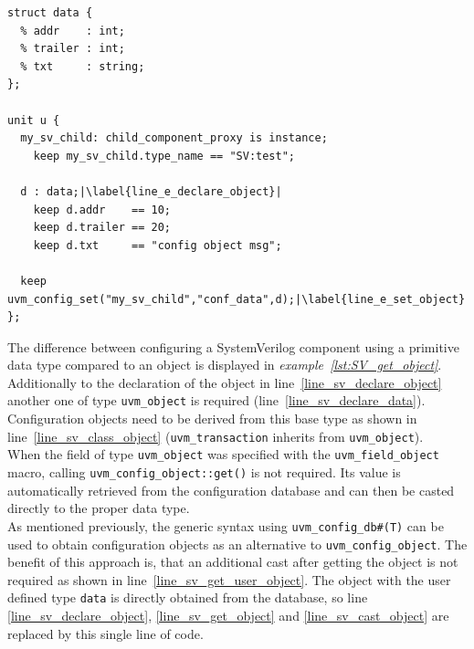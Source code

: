 \lstset{language=e, numbers = left, escapechar=|, breaklines=true}
\begin{lstlisting}[frame=htrbl, caption={e: register an object in configuration database}, label={lst:e_set_object}]
struct data {
  % addr    : int;
  % trailer : int;
  % txt     : string;
};

unit u {
  my_sv_child: child_component_proxy is instance;
    keep my_sv_child.type_name == "SV:test";
  
  d : data;|\label{line_e_declare_object}|
    keep d.addr    == 10;
    keep d.trailer == 20;
    keep d.txt     == "config object msg";

  keep uvm_config_set("my_sv_child","conf_data",d);|\label{line_e_set_object}|
};
\end{lstlisting}
The difference between configuring a SystemVerilog component using a primitive data type compared to an object
is displayed in \emph{example~\ref{lst:SV_get_object}}. Additionally to the declaration of the object in
line~\ref{line_sv_declare_object} another one of type \lstinline$uvm_object$ is required
(line~\ref{line_sv_declare_data}). Configuration objects need to be derived from this base type as shown in
line~\ref{line_sv_class_object} (\lstinline$uvm_transaction$ inherits from \lstinline$uvm_object$).\\
When the field of type \lstinline$uvm_object$ was specified with the \lstinline$uvm_field_object$ macro, calling
\lstinline$uvm_config_object::get()$ is not required. Its value is automatically retrieved from the configuration
database and can then be casted directly to the proper data type.\\
As mentioned previously, the generic syntax using \lstinline$uvm_config_db#(T)$ can be used to obtain configuration
objects as an alternative to \lstinline$uvm_config_object$.
The benefit of this approach is, that an additional cast after getting the object is not required as shown in
line~\ref{line_sv_get_user_object}. The object with the user defined type \lstinline$data$ is directly obtained from
the database, so line \ref{line_sv_declare_object}, \ref{line_sv_get_object} and \ref{line_sv_cast_object} are replaced
by this single line of code.

